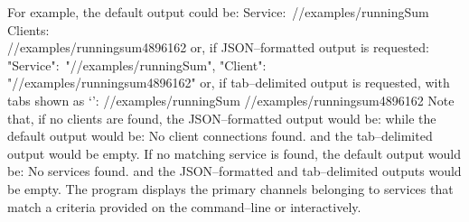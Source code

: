 For example, the default output could be:
\outputBegin{}
Service:\ /\serviceName/examples/runningSum\\
\settowidth{\uL}{Cli}%
Clients:\\
\hspace*{\uL}/\clientName/examples/runningsum\textunderscore{}4896162
\outputEnd{}
or, if JSON--formatted output is requested:
\outputBegin{}
\openSq{} \textbraceleft{} "Service":\ "/\serviceName/examples/runningSum", "Client":\ \\
"/\clientName/examples/runningsum\textunderscore{}4896162" \textbraceright{} \closeSq
\outputEnd{}
or, if tab--delimited output is requested, with tabs shown as `\tabSymbol':
\outputBegin{}
/\serviceName/examples/runningSum\pseudotab{}%
/\clientName/examples/runningsum\textunderscore{}4896162
\outputEnd{}
Note that, if no clients are found, the JSON--formatted output would be:
\outputBegin{}
\sqPair
\outputEnd{}
while the default output would be:
\outputBegin{}
No client connections found.
\outputEnd{}
and the tab--delimited output would be empty.
If no matching service is found, the default output would be:
\outputBegin{}
No services found.
\outputEnd{}
and the JSON--formatted and tab--delimited outputs would be empty.
The program  displays the primary channels belonging to
services that match a criteria provided on the command--line or interactively.\\

